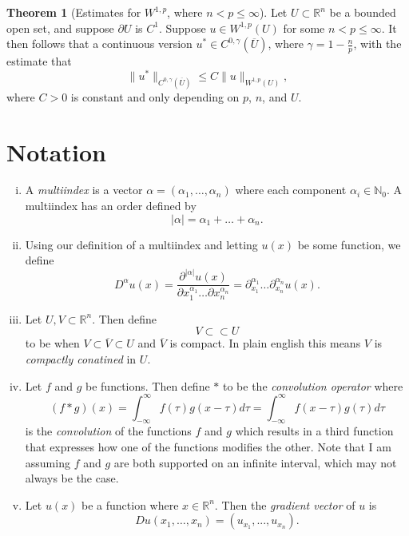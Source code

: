 \documentclass[11pt]{article}
\theoremstyle{definition}
\newtheorem*{theorem}{Theorem}
\begin{document}
\begin{theorem}[Estimates for $W^{1,p}$, where $n < p \leq \infty$]
Let $U \subset \mathbb{R}^n$ be a bounded open set, and suppose $\partial U$ is $C^1$.
	Suppose $u \in W^{1,p}(U)$ for some $n < p \leq \infty$. It then follows that a continuous version $u^* \in C^{0,\gamma}(\overline{U})$,
where $\gamma = 1 - \frac{n}{p}$, with the estimate that
	\[\|u^*\|_{C^{0,\gamma}(\overline{U})} \leq C\|u\|_{W^{1,p}(U)},\]
where $C > 0$ is constant and only depending on $p$, $n$, and $U$.
\end{theorem}

\newpage

\section{Notation}
\begin{enumerate}[(i)]
	\item A \textit{multiindex} is a vector $\alpha = (\alpha_1, \dots, \alpha_n)$ where each component $\alpha_i \in \mathbb{N}_0$.
A multiindex has an order defined by
\[|\alpha| = \alpha_1 + \dots + \alpha_n.\]

\item Using our definition of a multiindex and letting $u(x)$ be some function, we define
\[D^{\alpha}u(x) = \frac{\partial^{|\alpha|}u(x)}{\partial x_1^{\alpha_1} \dots \partial x_n^{\alpha_n}} = \partial_{x_1}^{\alpha_1}\dots\partial_{x_n}^{\alpha_n}u(x).\]

\item Let $U,V \subset \mathbb{R}^n$. Then define
\[V \subset\subset U\]
to be when $V \subset \overline{V} \subset U$ and $\overline{V}$ is compact. In plain english this means $V$ is \textit{compactly conatined} in $U$.

\item Let $f$ and $g$ be functions. Then define $*$ to be the \textit{convolution operator} where
\[(f*g)(x) = \int_{-\infty}^{\infty}{f(\tau)g(x - \tau)d\tau} = \int_{-\infty}^{\infty}{f(x - \tau)g(\tau)d\tau}\]
is the \textit{convolution} of the functions $f$ and $g$ which results in a third function that expresses
how one of the functions modifies the other. Note that I am assuming $f$ and $g$ are both supported on an
infinite interval, which may not always be the case.

\item Let $u(x)$ be a function where $x \in \mathbb{R}^n$. Then the \textit{gradient vector} of $u$ is 
	\[Du(x_1,\dots,x_n) = (u_{x_1},...,u_{x_n}).\]
\end{enumerate}
\end{document}
